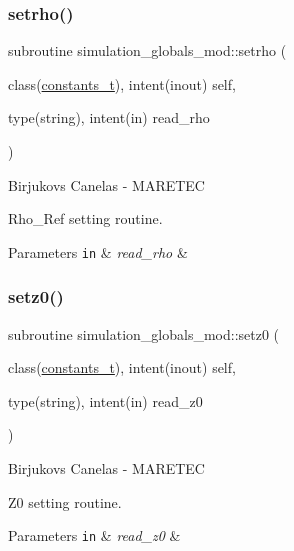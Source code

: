 \subsubsection{\texorpdfstring{setrho()}{setrho()}}
{\footnotesize\ttfamily subroutine simulation\+\_\+globals\+\_\+mod\+::setrho (\begin{DoxyParamCaption}\item[{class(\hyperlink{structsimulation__globals__mod_1_1constants__t}{constants\+\_\+t}), intent(inout)}]{self,  }\item[{type(string), intent(in)}]{read\+\_\+rho }\end{DoxyParamCaption})\hspace{0.3cm}{\ttfamily [private]}}



Birjukovs Canelas -\/ M\+A\+R\+E\+T\+EC 

Rho\+\_\+\+Ref setting routine. 
\begin{DoxyParams}[1]{Parameters}
\mbox{\tt in}  & {\em read\+\_\+rho} & \\
\hline
\end{DoxyParams}
\mbox{\label{namespacesimulation__globals__mod_a64b1d91147c1cd5898fec8f23d56a65d}} 
\subsubsection{\texorpdfstring{setz0()}{setz0()}}
{\footnotesize\ttfamily subroutine simulation\+\_\+globals\+\_\+mod\+::setz0 (\begin{DoxyParamCaption}\item[{class(\hyperlink{structsimulation__globals__mod_1_1constants__t}{constants\+\_\+t}), intent(inout)}]{self,  }\item[{type(string), intent(in)}]{read\+\_\+z0 }\end{DoxyParamCaption})\hspace{0.3cm}{\ttfamily [private]}}



Birjukovs Canelas -\/ M\+A\+R\+E\+T\+EC 

Z0 setting routine. 
\begin{DoxyParams}[1]{Parameters}
\mbox{\tt in}  & {\em read\+\_\+z0} & \\
\hline
\end{DoxyParams}


